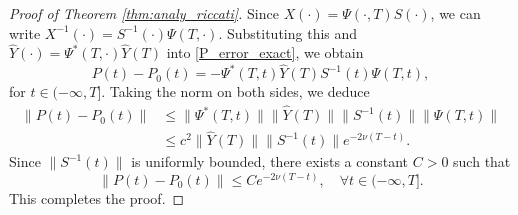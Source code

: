 \documentclass{IEEEtran}
\begin{document}
\begin{proof}[Proof of Theorem \ref{thm:analy_riccati}]
		Since $X(\cdot) = \Psi(\cdot,T)S(\cdot)$, we can write $X^{-1}(\cdot) = S^{-1}(\cdot)\Psi(T,\cdot)$. Substituting this and $\hat{Y}(\cdot) = \Psi^*(T,\cdot)\hat{Y}(T)$ into \eqref{P_error_exact}, we obtain
		\begin{equation}
			P(t) - P_0(t) = -\Psi^*(T,t)\hat{Y}(T) S^{-1}(t) \Psi(T,t),
		\end{equation}for $t\in(-\infty,T]$.
		Taking the norm on both sides, we deduce
		\begin{equation}
			\begin{split}
				\|P(t) - P_0(t)\| &\leq \|\Psi^*(T,t)\| \|\hat{Y}(T)\| \|S^{-1}(t)\| \|\Psi(T,t)\| \\
				&\leq c^2 \|\hat{Y}(T)\| \|S^{-1}(t)\| e^{-2\nu(T-t)}.
			\end{split}
		\end{equation}
		Since $\|S^{-1}(t)\|$ is uniformly bounded, there exists a constant $C > 0$ such that
		\begin{equation}
			\|P(t) - P_0(t)\| \leq C e^{-2\nu(T-t)}, \quad \forall t \in (-\infty, T].
		\end{equation}
		This completes the proof.
	\end{proof}
	
\end{document}
